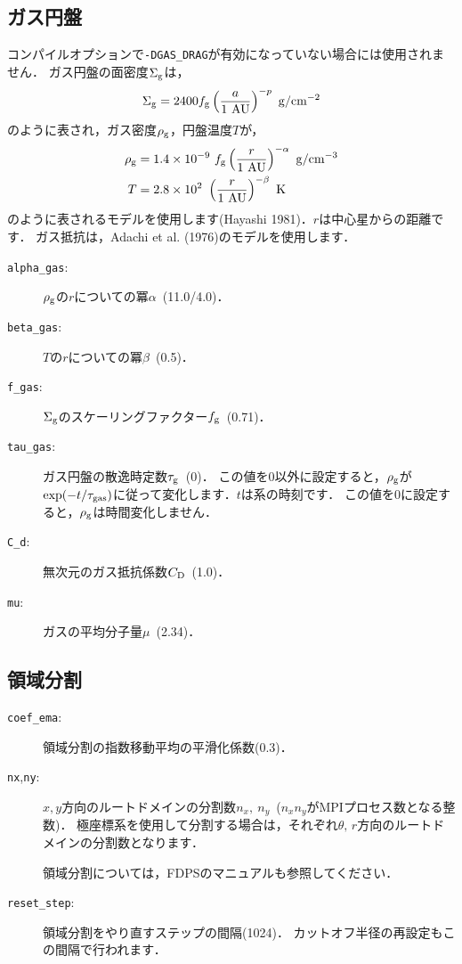 \documentclass[12pt,a4paper,dvipdfmx]{jsarticle}
\begin{document}
\subsection{ガス円盤}
コンパイルオプションで\texttt{-DGAS\_DRAG}が有効になっていない場合には使用されません．
ガス円盤の面密度$\Sigma_{\rm g}$は，
\begin{equation}
\Sigma_{\rm g}=2400f_{\rm g}\left( \frac{a}{1\ {\rm AU}} \right)^{-p}\ {\rm g/cm^{-2}}\label{sigmag}
\end{equation}
のように表され，ガス密度$\rho_{\rm g}$，円盤温度$T$が，
\begin{align}
\rho_{\rm g}&=1.4\times 10^{-9}\ f_{\rm g}\left( \frac{r}{1\ {\rm AU}} \right)^{-\alpha}\ {\rm g/cm^{-3}}\\
T&=2.8\times 10^{2}\ \left( \frac{r}{1\ {\rm AU}} \right)^{-\beta}\ {\rm K}
\end{align}
のように表されるモデルを使用します(Hayashi 1981)．$r$は中心星からの距離です．
ガス抵抗は，Adachi et al. (1976)のモデルを使用します．

\begin{description}
\item[\texttt{alpha\_gas}:]
$\rho_{\rm g}$の$r$についての冪$\alpha$\ (11.0/4.0)．
\item[\texttt{beta\_gas}:]
$T$の$r$についての冪$\beta$\ (0.5)．
\item[\texttt{f\_gas}:]
$\Sigma_{\rm g}$のスケーリングファクター$f_{\rm g}$\ (0.71)．
\item[\texttt{tau\_gas}:]
ガス円盤の散逸時定数$\tau_{\rm g}$\ (0)．
この値を$0$以外に設定すると，$\rho_{\rm g}$が$\exp(-t/\tau_{\rm gas})$に従って変化します．$t$は系の時刻です．
この値を$0$に設定すると，$\rho_{\rm g}$は時間変化しません．
\item[\texttt{C\_d}:]
無次元のガス抵抗係数$C_{\rm D}$\ (1.0)．
\item[\texttt{mu}:]
ガスの平均分子量$\mu$\ (2.34)．
\end{description}

\subsection{領域分割}
\begin{description}
\item[\texttt{coef\_ema}:]
領域分割の指数移動平均の平滑化係数(0.3)．
\item[\texttt{nx},\texttt{ny}:]
$x,y$方向のルートドメインの分割数$n_{x},\ n_{y}$\ ($n_{x}n_{y}$がMPIプロセス数となる整数)．
極座標系を使用して分割する場合は，それぞれ$\theta,\, r$方向のルートドメインの分割数となります．

領域分割については，FDPSのマニュアルも参照してください．
\item[\texttt{reset\_step}:]
領域分割をやり直すステップの間隔(1024)．%
カットオフ半径の再設定もこの間隔で行われます．
\end{description}
\end{document}
